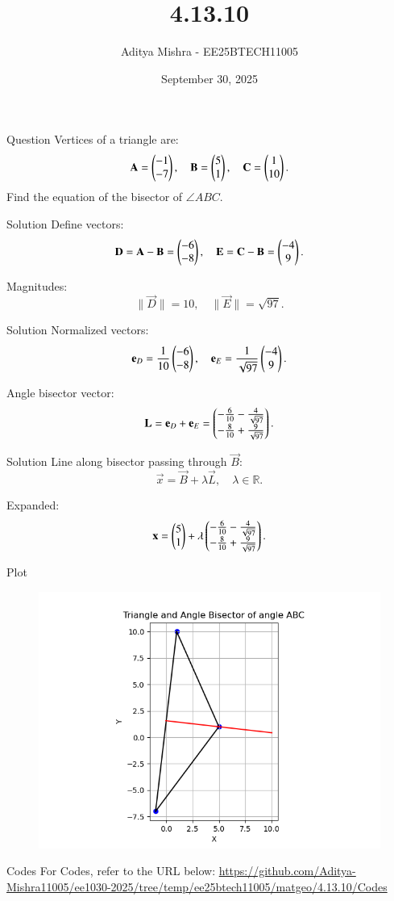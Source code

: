 \documentclass{beamer}
\title{4.13.10}
\author{Aditya Mishra - EE25BTECH11005}
\date{September 30, 2025}
\begin{document}
\begin{frame}
\titlepage
\end{frame}

\begin{frame}{Question}
Vertices of a triangle are:
\[
\mathbf{A} = \begin{pmatrix}-1 \\ -7\end{pmatrix}, \quad
\mathbf{B} = \begin{pmatrix}5 \\ 1\end{pmatrix}, \quad
\mathbf{C} = \begin{pmatrix}1 \\ 10\end{pmatrix}.
\]
Find the equation of the bisector of \(\angle ABC\).
\end{frame}

\begin{frame}{Solution}
Define vectors:
\[
\mathbf{D} = \mathbf{A} - \mathbf{B} = \begin{pmatrix}-6 \\ -8\end{pmatrix}, \quad
\mathbf{E} = \mathbf{C} - \mathbf{B} = \begin{pmatrix}-4 \\ 9\end{pmatrix}.
\]

Magnitudes:
\[
\|\vec{D}\|=10, \quad \|\vec{E}\|=\sqrt{97}.
\]
\end{frame}

\begin{frame}{Solution}
Normalized vectors:
\[
\mathbf{e}_D = \frac{1}{10} \begin{pmatrix}-6 \\ -8\end{pmatrix}, \quad
\mathbf{e}_E = \frac{1}{\sqrt{97}} \begin{pmatrix}-4 \\ 9\end{pmatrix}.
\]

Angle bisector vector:
\[
\mathbf{L} = \mathbf{e}_D + \mathbf{e}_E = \begin{pmatrix}-\frac{6}{10} - \frac{4}{\sqrt{97}} \\
-\frac{8}{10} + \frac{9}{\sqrt{97}}\end{pmatrix}.
\]
\end{frame}

\begin{frame}{Solution}
Line along bisector passing through \(\vec{B}\):
\[
\vec{x} = \vec{B} + \lambda \vec{L}, \quad \lambda \in \mathbb{R}.
\]

Expanded:
\[
\mathbf{x} = \begin{pmatrix}5 \\ 1\end{pmatrix} + \lambda \begin{pmatrix}-\frac{6}{10} - \frac{4}{\sqrt{97}} \\ -\frac{8}{10} + \frac{9}{\sqrt{97}}\end{pmatrix}.
\]
\end{frame}
\begin{frame}{Plot}
\begin{figure}
    \centering
    \includegraphics[width=0.8\columnwidth]{Figs/Figure_1.png}
\end{figure}
\end{frame}

\begin{frame}{Codes}
\centering
For Codes, refer to the URL below:  
\url{https://github.com/Aditya-Mishra11005/ee1030-2025/tree/temp/ee25btech11005/matgeo/4.13.10/Codes}
\end{frame}
\end{document}
